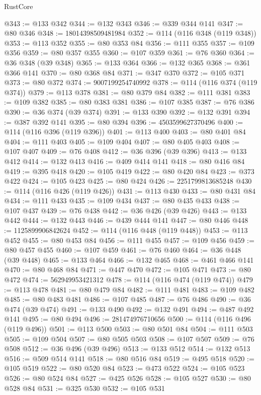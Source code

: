 \begin{lexlean}{RustCore}
\begin{coremodule}
@343 := @133 @342
@344 := @132 @343
@346 := @339 @344 @141
@347 := @80 @346
@348 := 18014398509481984
@352 := @114 (@116 @348 (@119 @348))
@353 := @113 @352
@355 := @80 @353 @84
@356 := @111 @355
@357 := @109 @356
@359 := @80 @357 @355
@360 := @107 @359
@361 := @76 @360
@364 := @36 @348 (@39 @348)
@365 := @133 @364
@366 := @132 @365
@368 := @361 @366 @141
@370 := @80 @368 @84
@371 := @347 @370
@372 := @105 @371
@373 := @80 @372
@374 := 9007199254740992
@378 := @114 (@116 @374 (@119 @374))
@379 := @113 @378
@381 := @80 @379 @84
@382 := @111 @381
@383 := @109 @382
@385 := @80 @383 @381
@386 := @107 @385
@387 := @76 @386
@390 := @36 @374 (@39 @374)
@391 := @133 @390
@392 := @132 @391
@394 := @387 @392 @141
@395 := @80 @394
@396 := 4503599627370496
@400 := @114 (@116 @396 (@119 @396))
@401 := @113 @400
@403 := @80 @401 @84
@404 := @111 @403
@405 := @109 @404
@407 := @80 @405 @403
@408 := @107 @407
@409 := @76 @408
@412 := @36 @396 (@39 @396)
@413 := @133 @412
@414 := @132 @413
@416 := @409 @414 @141
@418 := @80 @416 @84
@419 := @395 @418
@420 := @105 @419
@422 := @80 @420 @84
@423 := @373 @422
@424 := @105 @423
@425 := @80 @424
@426 := 2251799813685248
@430 := @114 (@116 @426 (@119 @426))
@431 := @113 @430
@433 := @80 @431 @84
@434 := @111 @433
@435 := @109 @434
@437 := @80 @435 @433
@438 := @107 @437
@439 := @76 @438
@442 := @36 @426 (@39 @426)
@443 := @133 @442
@444 := @132 @443
@446 := @439 @444 @141
@447 := @80 @446
@448 := 1125899906842624
@452 := @114 (@116 @448 (@119 @448))
@453 := @113 @452
@455 := @80 @453 @84
@456 := @111 @455
@457 := @109 @456
@459 := @80 @457 @455
@460 := @107 @459
@461 := @76 @460
@464 := @36 @448 (@39 @448)
@465 := @133 @464
@466 := @132 @465
@468 := @461 @466 @141
@470 := @80 @468 @84
@471 := @447 @470
@472 := @105 @471
@473 := @80 @472
@474 := 562949953421312
@478 := @114 (@116 @474 (@119 @474))
@479 := @113 @478
@481 := @80 @479 @84
@482 := @111 @481
@483 := @109 @482
@485 := @80 @483 @481
@486 := @107 @485
@487 := @76 @486
@490 := @36 @474 (@39 @474)
@491 := @133 @490
@492 := @132 @491
@494 := @487 @492 @141
@495 := @80 @494
@496 := 281474976710656
@500 := @114 (@116 @496 (@119 @496))
@501 := @113 @500
@503 := @80 @501 @84
@504 := @111 @503
@505 := @109 @504
@507 := @80 @505 @503
@508 := @107 @507
@509 := @76 @508
@512 := @36 @496 (@39 @496)
@513 := @133 @512
@514 := @132 @513
@516 := @509 @514 @141
@518 := @80 @516 @84
@519 := @495 @518
@520 := @105 @519
@522 := @80 @520 @84
@523 := @473 @522
@524 := @105 @523
@526 := @80 @524 @84
@527 := @425 @526
@528 := @105 @527
@530 := @80 @528 @84
@531 := @325 @530
@532 := @105 @531

\end{coremodule}
\end{lexlean}
